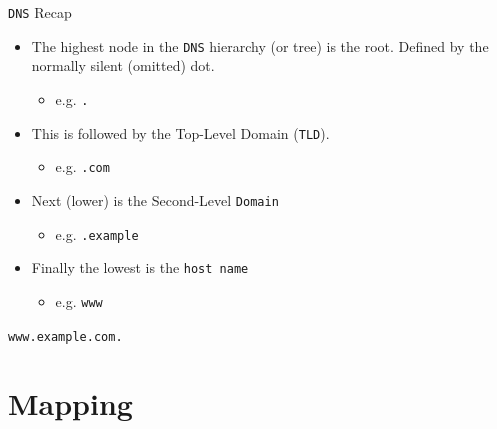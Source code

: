 \documentclass[xcolor=table,aspectratio=169]{beamer}
\begin{document}
\begin{frame}{\texttt{DNS} Recap}
  \begin{itemize}
    \item The highest node in the \texttt{DNS} hierarchy (or tree) is the root. Defined by the normally silent (omitted) dot. 
      \begin{itemize}
        \item e.g. \texttt{.}
      \end{itemize}
    \item This is followed by the Top-Level Domain (\texttt{TLD}). 
      \begin{itemize}
        \item e.g. \texttt{.com}
      \end{itemize}
    \item Next (lower) is the Second-Level \texttt{Domain}
      \begin{itemize}
        \item e.g. \texttt{.example}
      \end{itemize}
    \item Finally the lowest is the \texttt{host name}
      \begin{itemize}
        \item e.g. \texttt{www}
      \end{itemize}    
  \end{itemize}
  \begin{tcolorbox}
    \begin{center}
      \texttt{www.example.com.}      
    \end{center}
  \end{tcolorbox}
\end{frame}

\section{Mapping}
\end{document}
